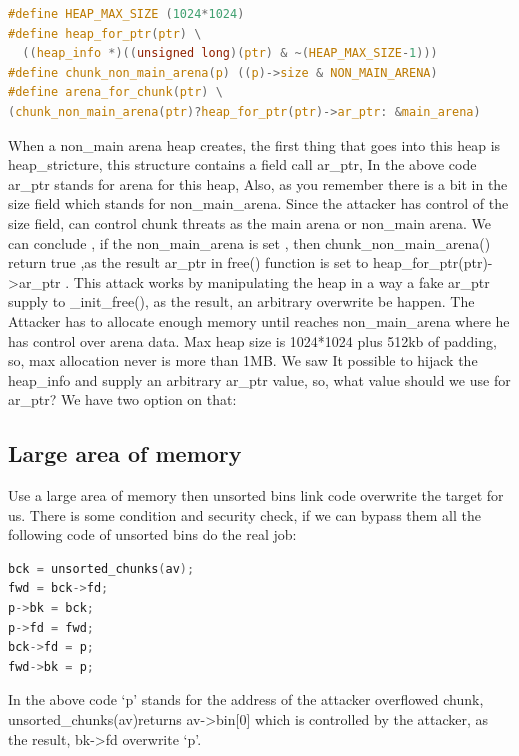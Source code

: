 \documentclass{masterthesis}
\newcommand*\ub{unsorted bins}
\begin{document}
\begin{lstlisting}[language=c,frame=tlrb]
#define HEAP_MAX_SIZE (1024*1024)
#define heap_for_ptr(ptr) \
  ((heap_info *)((unsigned long)(ptr) & ~(HEAP_MAX_SIZE-1)))
#define chunk_non_main_arena(p) ((p)->size & NON_MAIN_ARENA)
#define arena_for_chunk(ptr) \
(chunk_non_main_arena(ptr)?heap_for_ptr(ptr)->ar_ptr: &main_arena)
 \end{lstlisting}
 
When a non\_main arena heap creates, the first thing that goes into this heap is heap\_stricture, this structure contains a field call ar\_ptr, In the above code ar\_ptr stands for arena for this heap, Also, as you remember there is a bit in the size field which stands for non\_main\_arena. Since the attacker has control of the size field, can control chunk threats as the main arena or non\_main arena. We can conclude , if the non\_main\_arena is set , then chunk\_non\_main\_arena() return true ,as the result ar\_ptr in free() function is set to heap\_for\_ptr(ptr)->ar\_ptr .
This attack works by manipulating the heap in a way a fake ar\_ptr supply to \_init\_free(), as the result, an arbitrary overwrite be happen. The Attacker has to allocate enough memory until reaches non\_main\_arena where he has control over arena data. Max heap size is 1024*1024 plus 512kb of padding, so, max allocation never is more than 1MB.
We saw It possible to hijack the heap\_info and supply an arbitrary ar\_ptr value, so, what value should we use for ar\_ptr? We have two option on that:

\subsection{Large area of memory}
Use a large area of memory then \ub{} link code overwrite the target for us. There is some condition and security check, if we can bypass them all the following code of \ub{} do the real job:
\begin{lstlisting}[language=c,frame=tlrb]
bck = unsorted_chunks(av);
fwd = bck->fd;
p->bk = bck;
p->fd = fwd;
bck->fd = p;
fwd->bk = p;
 \end{lstlisting}
In the above code ‘p’ stands for the address of the attacker overflowed chunk, unsorted\_chunks(av)returns av->bin[0] which is controlled by the attacker, as the result, bk->fd overwrite ‘p’.
\end{document}
